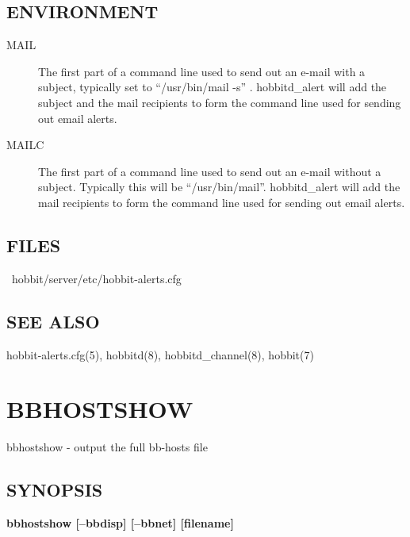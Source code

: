 


 
\subsection{ENVIRONMENT}
\begin{description}
\item[MAIL] The first part of a command line used to send out an
  e-mail with a subject, typically set to ``/usr/bin/mail -s''
  . hobbitd\_alert will add the subject and the mail recipients to
  form the command line used for sending out email alerts. 


 

\item[MAILC] The first part of a command line used to send out an
  e-mail without a subject. Typically this will be
  ``/usr/bin/mail''. hobbitd\_alert will add the mail recipients to
  form the command line used for sending out email alerts. 


 
\end{description}
\subsection{FILES}
\begin{description}
\item[~hobbit/server/etc/hobbit-alerts.cfg]


\end{description}
\subsection{SEE ALSO}
hobbit-alerts.cfg(5), hobbitd(8), hobbitd\_channel(8), hobbit(7) 

 
%
\newpage
\section{BBHOSTSHOW}

 bbhostshow - output the full bb-hosts file 
\subsection{SYNOPSIS}
\textbf{bbhostshow [--bbdisp] [--bbnet] [filename]}



